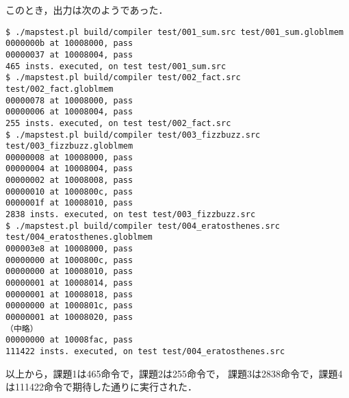 \documentclass[lualatex, a4paper, ja=standard]{bxjsarticle}
\begin{document}
このとき，出力は次のようであった．
\begin{Verbatim}[frame=lines]
$ ./mapstest.pl build/compiler test/001_sum.src test/001_sum.globlmem
0000000b at 10008000, pass
00000037 at 10008004, pass
465 insts. executed, on test test/001_sum.src
$ ./mapstest.pl build/compiler test/002_fact.src test/002_fact.globlmem
00000078 at 10008000, pass
00000006 at 10008004, pass
255 insts. executed, on test test/002_fact.src
$ ./mapstest.pl build/compiler test/003_fizzbuzz.src test/003_fizzbuzz.globlmem
00000008 at 10008000, pass
00000004 at 10008004, pass
00000002 at 10008008, pass
00000010 at 1000800c, pass
0000001f at 10008010, pass
2838 insts. executed, on test test/003_fizzbuzz.src
$ ./mapstest.pl build/compiler test/004_eratosthenes.src test/004_eratosthenes.globlmem
000003e8 at 10008000, pass
00000000 at 1000800c, pass
00000000 at 10008010, pass
00000001 at 10008014, pass
00000001 at 10008018, pass
00000000 at 1000801c, pass
00000001 at 10008020, pass
（中略）
00000000 at 10008fac, pass
111422 insts. executed, on test test/004_eratosthenes.src
\end{Verbatim}

以上から，課題1は465命令で，課題2は255命令で，
課題3は2838命令で，課題4は111422命令で期待した通りに実行された．
\end{document}
